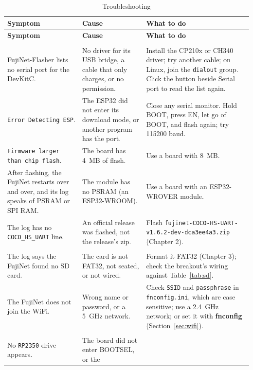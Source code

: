 \documentclass[10pt,twoside,openany]{book}
\newcommand{\cmd}[1]{\textbf{#1}}            %
\newcommand{\file}[1]{\texttt{#1}}           %
\newcommand{\key}[1]{\textsf{\small #1}}     %
\newcommand{\sans}[1]{\textsf{#1}}
\newcommand{\lfile}[1]{\nolinkurl{#1}}      %
\begin{document}
{\small
\begin{longtable}{@{}>{\raggedright\arraybackslash}p{1.7in}>{\raggedright\arraybackslash}p{1.5in}>{\raggedright\arraybackslash}p{2.9in}@{}}
\caption{Troubleshooting}\label{tab:trouble}\\
\toprule
\textbf{Symptom} & \textbf{Cause} & \textbf{What to do}\\
\midrule
\endfirsthead
\toprule
\textbf{Symptom} & \textbf{Cause} & \textbf{What to do}\\
\midrule
\endhead
\multicolumn{3}{@{}l}{\sffamily\bfseries Flashing the FujiNet}\\[2pt]
FujiNet-Flasher lists no serial port for the DevKitC. & No driver for its
USB bridge, a cable that only charges, or no permission. & Install the
CP210x or CH340 driver; try another cable; on Linux, join the
\texttt{dialout} group. Click the button beside \sans{Serial port} to read
the list again.\\
\texttt{Error Detecting ESP}. & The ESP32 did not enter its download mode,
or another program has the port. & Close any serial monitor. Hold
\key{BOOT}, press \key{EN}, let go of \key{BOOT}, and flash again; try
115200 baud.\\
\texttt{Firmware larger than chip flash}. & The board has 4~MB of flash. &
Use a board with 8~MB.\\
After flashing, the FujiNet restarts over and over, and its log speaks of
PSRAM or SPI RAM. & The module has no PSRAM (an ESP32-WROOM). & Use a
board with an ESP32-WROVER module.\\
The log has no \texttt{COCO\_HS\_UART} line. & An official release was
flashed, not the release's zip. & Flash
\lfile{fujinet-COCO-HS-UART-v1.6.2-dev-dca3ee4a3.zip} (Chapter 2).\\[4pt]
\multicolumn{3}{@{}l}{\sffamily\bfseries The SD card}\\[2pt]
The log says the FujiNet found no SD card. & The card is not FAT32, not
seated, or not wired. & Format it FAT32 (Chapter 3); check the breakout's
wiring against Table~\ref{tab:sd}.\\
The FujiNet does not join the WiFi. & Wrong name or password, or a 5~GHz
network. & Check \texttt{SSID} and \texttt{passphrase} in
\file{fnconfig.ini}, which are case sensitive; use a 2.4~GHz network; or
set it with \cmd{fnconfig} (Section~\ref{sec:wifi}).\\[4pt]
\multicolumn{3}{@{}l}{\sffamily\bfseries The TFR/911H and the tether}\\[2pt]
No \file{RP2350} drive appears. & The board did not enter BOOTSEL, or the

\end{longtable}}
\end{document}

